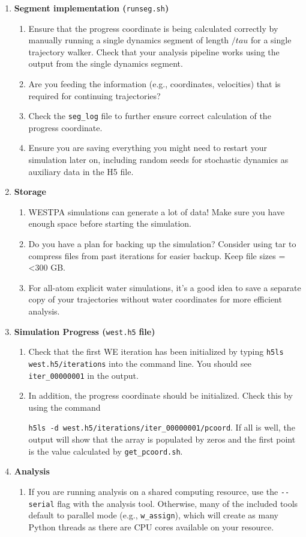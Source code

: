 \documentclass[9pt,tutorial,pubversion]{livecoms}
\begin{document}
\begin{enumerate}
\begin{enumerate}
\end{enumerate}
\item \textbf{Segment implementation (}\verb|runseg.sh|\textbf{)}
\begin{enumerate}
\item Ensure that the progress coordinate is being calculated correctly by manually running a single dynamics segment of length $/tau$ for a single trajectory walker. 
Check that your analysis pipeline works using the output from the single dynamics segment. 
\item Are you feeding the information (e.g., coordinates, velocities) that is required for continuing trajectories? 
\item Check the \verb|seg_log| file to further ensure correct calculation of the progress coordinate. 
\item Ensure you are saving everything you might need to restart your simulation later on, including random seeds for stochastic dynamics as auxiliary data in the H5 file. 
\end{enumerate}
\item \textbf{Storage}
\begin{enumerate}
\item WESTPA simulations can generate a lot of data! Make sure you have enough space before starting the simulation.
\item Do you have a plan for backing up the simulation? 
Consider using tar to compress files from past iterations for easier backup. 
Keep file sizes =<300 GB. 
\item For all-atom explicit water simulations, it's a good idea to save a separate copy of your trajectories without water coordinates for more efficient analysis.
\end{enumerate}
\item \textbf{Simulation Progress (}\verb|west.h5| \textbf{file)}
\begin{enumerate}
\item Check that the first WE iteration has been initialized by typing \verb|h5ls west.h5/iterations| into the command line.  
You should see \verb|iter_00000001| in the output.
\item In addition, the progress coordinate should be initialized.
Check this by using the command 

\verb|h5ls -d west.h5/iterations/iter_00000001/pcoord|.
If all is well, the output will show that the array is populated by zeros and the first point is the value calculated by \verb|get_pcoord.sh|.
\end{enumerate}
\item \textbf{Analysis}
\begin{enumerate}
\item If you are running analysis on a shared computing resource, use the \verb|--serial| flag with the analysis tool. 
Otherwise, many of the included tools default to parallel mode (e.g., \verb|w_assign|), which will create as many Python threads as there are CPU cores available on your resource.
\end{enumerate}
\end{enumerate}
\end{document}
